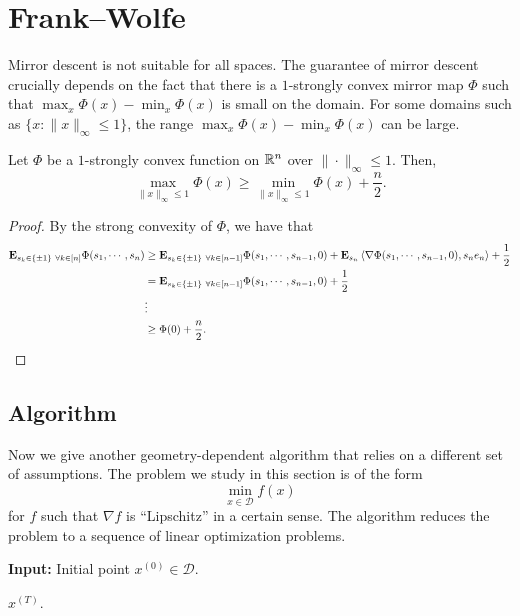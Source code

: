 
\section{Frank--Wolfe \label{sec:FrankWolfe}}

Mirror descent is not suitable for all spaces. The guarantee of mirror
descent crucially depends on the fact that there is a $1$-strongly
convex mirror map $\Phi$ such that $\max_{x}\Phi(x)-\min_{x}\Phi(x)$
is small on the domain. For some domains such as $\{x:\|x\|_{\infty}\leq1\}$,
the range $\max_{x}\Phi(x)-\min_{x}\Phi(x)$ can be large.
\begin{lem}
Let $\Phi$ be a $1$-strongly convex function on $\mathbb{R}^{n}$ over $\|\cdot\|_{\infty}\leq1$.
Then, 
\[
\max_{\|x\|_{\infty}\leq1}\Phi(x)\geq\min_{\|x\|_{\infty}\leq1}\Phi(x)+\frac{n}{2}.
\]
\end{lem}

\begin{proof}
By the strong convexity of $\Phi$, we have that 
\begin{align*}
\mathbf{E}_{s_{k}\in\{\pm1\}\ \forall k\in[n]}\Phi(s_{1},\cdots,s_{n}) & \geq\mathbf{E}_{s_{k}\in\{\pm1\}\ \forall k\in[n-1]}\Phi(s_{1},\cdots,s_{n-1},0)+\mathbf{E}_{s_{n}}\left\langle \nabla\Phi(s_{1},\cdots,s_{n-1},0),s_{n}e_{n}\right\rangle +\frac{1}{2}\\
 & =\mathbf{E}_{s_{k}\in\{\pm1\}\ \forall k\in[n-1]}\Phi(s_{1},\cdots,s_{n-1},0)+\frac{1}{2}\\
 & \vdots\\
 & \geq\Phi(0)+\frac{n}{2}.
\end{align*}
\end{proof}

\subsection{Algorithm}

Now we give another geometry-dependent algorithm that relies on a
different set of assumptions. The problem we study in this section
is of the form
\[
\min_{x\in\mathcal{D}}f(x)
\]
for $f$ such that $\nabla f$ is ``Lipschitz'' in a certain sense.
The algorithm reduces the problem to a sequence of linear optimization
problems.

\begin{algorithm2e}[H]

\caption{$\mathtt{FrankWolfe}$}

\SetAlgoLined

\textbf{Input:} Initial point $x^{(0)}\in\mathcal{D}$.


\Return $x^{(T)}$.

\end{algorithm2e}


